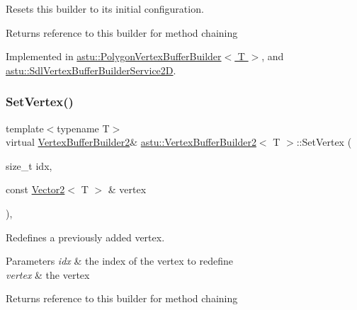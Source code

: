 Resets this builder to its initial configuration.

\begin{DoxyReturn}{Returns}
reference to this builder for method chaining 
\end{DoxyReturn}


Implemented in \hyperlink{classastu_1_1PolygonVertexBufferBuilder_a1d0b4429c0fefa106f056a6406ba1d89}{astu\+::\+Polygon\+Vertex\+Buffer\+Builder$<$ T $>$}, and \hyperlink{classastu_1_1SdlVertexBufferBuilderService2D_a0a9bae699849ddf8ce74f591857e00d9}{astu\+::\+Sdl\+Vertex\+Buffer\+Builder\+Service2D}.

\mbox{\label{classastu_1_1VertexBufferBuilder2_a36eb7c96971e245110f9674779323666}} 
\subsubsection{\texorpdfstring{Set\+Vertex()}{SetVertex()}\hspace{0.1cm}{\footnotesize\ttfamily [1/2]}}
{\footnotesize\ttfamily template$<$typename T$>$ \\
virtual \hyperlink{classastu_1_1VertexBufferBuilder2}{Vertex\+Buffer\+Builder2}\& \hyperlink{classastu_1_1VertexBufferBuilder2}{astu\+::\+Vertex\+Buffer\+Builder2}$<$ T $>$\+::Set\+Vertex (\begin{DoxyParamCaption}\item[{size\+\_\+t}]{idx,  }\item[{const \hyperlink{classastu_1_1Vector2}{Vector2}$<$ T $>$ \&}]{vertex }\end{DoxyParamCaption})\hspace{0.3cm}{\ttfamily [inline]}, {\ttfamily [virtual]}}

Redefines a previously added vertex.


\begin{DoxyParams}{Parameters}
{\em idx} & the index of the vertex to redefine \\
\hline
{\em vertex} & the vertex \\
\hline
\end{DoxyParams}
\begin{DoxyReturn}{Returns}
reference to this builder for method chaining 
\end{DoxyReturn}
\mbox{\label{classastu_1_1VertexBufferBuilder2_aad6f4a82b30b026ee7140b88edb053b2}} 
